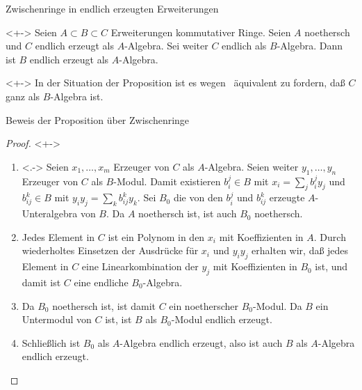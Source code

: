 \begin{frame}{Zwischenringe in endlich erzeugten Erweiterungen}
	\begin{proposition}<+->
		\label{prop:intermediate_ring}
		Seien \(A \subset B \subset C\) Erweiterungen kommutativer Ringe. Seien \(A\) noethersch
		und \(C\) endlich erzeugt als \(A\)-Algebra. Sei weiter \(C\) endlich als \(B\)-Algebra.
		Dann ist \(B\) endlich erzeugt als \(A\)-Algebra.
	\end{proposition}
	\begin{remark}<+->
		In der Situation der Proposition ist es wegen~ äquivalent zu fordern, daß \(C\) ganz als \(B\)-Algebra ist.
	\end{remark}
\end{frame}

\begin{frame}{Beweis der Proposition über Zwischenringe}
	\begin{proof}<+->
		\begin{enumerate}[<+->]
		\item<.->
			Seien \(x_1, \dotsc, x_m\) Erzeuger von \(C\) als \(A\)-Algebra. Seien weiter
			\(y_1, \dotsc, y_n\) Erzeuger von \(C\) als \(B\)-Modul. Damit existieren
			\(b_i^j \in B\) mit \(x_i = \sum\limits_j b_i^j y_j\) und \(b_{ij}^k \in B\)
			mit \(y_i y_j = \sum\limits_k b_{ij}^k y_k\). Sei \(B_0\) die von den \(b_i^j\) und
			\(b_{ij}^k\) erzeugte \(A\)-Unteralgebra von \(B\). Da \(A\)
			noethersch ist, ist auch \(B_0\) noethersch.
		\item
			Jedes Element in \(C\) ist ein Polynom in den \(x_i\) mit Koeffizienten in \(A\).
			Durch wiederholtes Einsetzen der Ausdrücke für \(x_i\) und \(y_i y_j\) erhalten wir,
			daß jedes Element in \(C\) eine Linearkombination der \(y_j\) mit Koeffizienten
			in \(B_0\) ist, und damit ist \(C\) eine endliche \(B_0\)-Algebra.
		\item
			Da \(B_0\) noethersch ist, ist damit \(C\) ein noetherscher \(B_0\)-Modul.
			Da \(B\) ein Untermodul von \(C\) ist, ist \(B\) als \(B_0\)-Modul endlich erzeugt.
		\item
			Schließlich ist \(B_0\) als \(A\)-Algebra endlich erzeugt, also ist
			auch \(B\) als \(A\)-Algebra endlich erzeugt.
		\qedhere
		\end{enumerate}
	\end{proof}
\end{frame}

